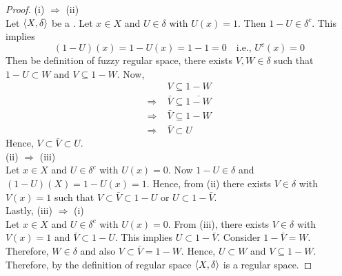\documentclass[../main-sheet.tex]{subfiles}
\begin{document}
\begin{proof}
    (i) \(\Rightarrow\) (ii)\\
    Let \(\langle X, \delta \rangle\) be a \fts. Let \(x\in X \) and \(U\in\delta\) with \(U(x)=1\). Then \(1-U\in\delta^c \). This implies
    \[(1-U)(x)=1-U(x)=1-1=0\quad\text{i.e., } U^c(x)=0\]
    Then be definition of fuzzy regular space, there exists \(V,W\in\delta\) such that \(1-U\subset W \) and \(V\subseteq 1-W \). Now,
    \begin{align*}
        &V\subseteq 1-W\\
        \Rightarrow\;&\bar{V}\subseteq \overline{1-W}\\
        \Rightarrow\;&\bar{V}\subseteq {1-W}\\
        \Rightarrow\;&\bar{V}\subset U
    \end{align*}
    Hence, \(V\subset \bar{V}\subset U \).\\

    (ii) \(\Rightarrow\) (iii)\\
    Let \(x\in X \) and \(U\in\delta^c \) with \(U(x)=0\). Now \(1-U\in\delta\) and \((1-U)(X)=1-U(x)=1\). Hence, from (ii) there exists \(V\in\delta\) with \(V(x)=1\) such that \(V\subset \bar{V}\subset 1-U \) or \(U\subset 1-\bar{V}\).\\

    Lastly, (iii) \(\Rightarrow\) (i)\\
    Let \(x\in X \) and \(U\in\delta^c\) with \(U(x)=0\). From (iii), there exists \(V\in\delta\) with \(V(x)=1\) and \(\bar{V}\subset 1-U \). This implies \(U\subset 1-\bar{V}\). Consider \(1-\bar{V}=W\). Therefore, \(W\in\delta\) and also \(V\subset \bar{V}=1-W\). Hence, \(U\subset W \) and \(V\subseteq 1-W \). Therefore, by the definition of regular space \(\langle X, \delta \rangle\) is a regular space.
\end{proof}
\end{document}
